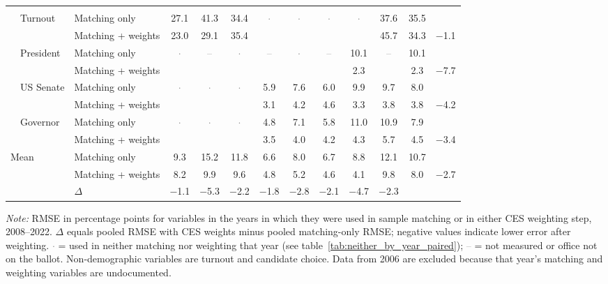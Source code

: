 \begin{table}[!htbp]
{\begin{threeparttable}
\begin{tabular}{llcccccccccc}
\addlinespace[0.3em]
\multicolumn{12}{l}{Non-demographic} \\
\addlinespace[0.1em]
~~Turnout & Matching only & 27.1 & 41.3 & 34.4 & \textcolor{gray}{$\cdot$} & \textcolor{gray}{$\cdot$} & \textcolor{gray}{$\cdot$} & \textcolor{gray}{$\cdot$} & 37.6 & 35.5 & \\
 & Matching + weights & 23.0 & 29.1 & 35.4 &  &  &  &  & 45.7 & 34.3 & $-$1.1 \\
\addlinespace[0.1em]
~~President & Matching only & \textcolor{gray}{$\cdot$} & \textcolor{gray}{--} & \textcolor{gray}{$\cdot$} & \textcolor{gray}{--} & \textcolor{gray}{$\cdot$} & \textcolor{gray}{--} & 10.1 & \textcolor{gray}{--} & 10.1 & \\
 & Matching + weights &  &  &  &  &  &  & 2.3 &  & 2.3 & $-$7.7 \\
\addlinespace[0.1em]
~~US Senate & Matching only & \textcolor{gray}{$\cdot$} & \textcolor{gray}{$\cdot$} & \textcolor{gray}{$\cdot$} & 5.9 & 7.6 & 6.0 & 9.9 & 9.7 & 8.0 & \\
 & Matching + weights &  &  &  & 3.1 & 4.2 & 4.6 & 3.3 & 3.8 & 3.8 & $-$4.2 \\
\addlinespace[0.1em]
~~Governor & Matching only & \textcolor{gray}{$\cdot$} & \textcolor{gray}{$\cdot$} & \textcolor{gray}{$\cdot$} & 4.8 & 7.1 & 5.8 & 11.0 & 10.9 & 7.9 & \\
 & Matching + weights &  &  &  & 3.5 & 4.0 & 4.2 & 4.3 & 5.7 & 4.5 & $-$3.4 \\
\midrule
Mean\tnote{b} & Matching only & 9.3 & 15.2 & 11.8 & 6.6 & 8.0 & 6.7 & 8.8 & 12.1 & 10.7 & \\
 & Matching + weights & 8.2 & 9.9 & 9.6 & 4.8 & 5.2 & 4.6 & 4.1 & 9.8 & 8.0 & $-$2.7 \\
 & $\Delta$ & $-$1.1 & $-$5.3 & $-$2.2 & $-$1.8 & $-$2.8 & $-$2.1 & $-$4.7 & $-$2.3 & & \\
\bottomrule
\end{tabular}
\begin{tablenotes}
\footnotesize
\item \textit{Note:} RMSE in percentage points for variables in the years in which they were used in sample matching or in either CES weighting step, 2008--2022. $\Delta$ equals pooled RMSE with CES weights minus pooled matching-only RMSE; negative values indicate lower error after weighting. \textcolor{gray}{$\cdot$} = used in neither matching nor weighting that year (see table~\ref{tab:neither_by_year_paired}); \textcolor{gray}{--} = not measured or office not on the ballot. Non-demographic variables are turnout and candidate choice. Data from 2006 are excluded because that year's matching and weighting variables are undocumented.

\end{tablenotes}
\end{threeparttable}}
\end{table}
